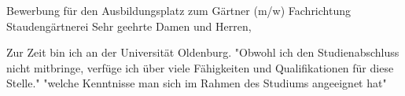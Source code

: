 \documentclass[12pt,a4paper]{moderncv}
\begin{document}
\Large{Bewerbung für den Ausbildungsplatz zum Gärtner (m/w) Fachrichtung Staudengärtnerei}
Sehr geehrte Damen und Herren,

Zur Zeit bin ich an der Universität Oldenburg. 
"Obwohl ich den Studienabschluss nicht mitbringe, verfüge ich über viele Fähigkeiten und Qualifikationen für diese Stelle."
 "welche Kenntnisse man sich im Rahmen des Studiums angeeignet hat"
\end{document}
